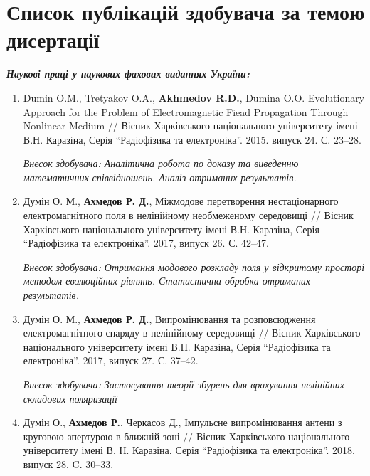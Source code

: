 \chapter{Список публікацій здобувача за темою дисертації}

\begin{center} 
\textit{\textbf{Наукові праці у наукових фахових виданнях України:}}
\end{center}


\begin{enumerate}

\item Dumin O.M., Tretyakov O.A., \textbf{Akhmedov R.D.}, Dumina O.O. 
Evolutionary Approach for the Problem of Electromagnetic Fiead 
Propagation Through Nonlinear Medium // Вісник Харківського національного 
університету імені В.Н. Каразіна, Серія ``Радіофізика та електроніка''. 
2015. випуск 24. С. 23--28.

\textit{Внесок здобувача: Аналітична робота по доказу та виведенню 
математичних співвідношень. Аналіз отриманих результатів.}

\item Думін О. М., \textbf{Ахмедов Р. Д.}, Міжмодове перетворення нестаціонарного 
електромагнітного поля в нелінійному необмеженому середовищі // Вісник 
Харківського національного університету імені В.Н. Каразіна, Серія 
``Радіофізика та електроніка''. 2017, випуск 26. С. 42--47.

\textit{Внесок здобувача: Отримання модового розкладу поля у відкритому 
просторі методом еволюційних рівнянь. Статистична обробка отриманих результатів. }

\item Думін О. М., \textbf{Ахмедов Р. Д.}, Випромінювання та розповсюдження 
електромагнітного снаряду в нелінійному середовищі // Вісник 
Харківського національного університету імені В.Н. Каразіна, Серія 
``Радіофізика та електроніка''. 2017, випуск 27. С. 37--42.

\textit{Внесок здобувача: Застосування теорії збурень для врахування 
нелінійних складових поляризації}

\item Думін О., \textbf{Ахмедов Р.}, Черкасов Д., Імпульсне випромінювання 
антени з круговою апертурою в ближній зоні // Вісник Харківського 
національного університету імені В. Н. Каразіна. Серія ``Радіофізика та 
електроніка''. 2018. випуск 28. C. 30--33.


\end{enumerate}
